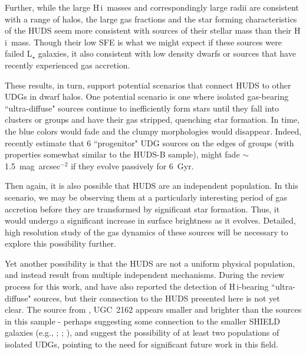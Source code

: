 \documentclass[twocolumn]{aastex6}
\newcommand{\hi}{H{\sc\,i}}
\begin{document}
Further, while the large \hi\ masses and correspondingly large radii are consistent with a range of halos, the large gas fractions and the star forming characteristics of the HUDS seem more consistent with sources of their stellar mass than their \hi\ mass. Though their low SFE is what we might expect if these sources were failed L$_{\star}$ galaxies, it also consistent with low density dwarfs or sources that have recently experienced gas accretion.%

These results, in turn, support potential scenarios that connect HUDS to other UDGs in dwarf halos. One potential scenario is one where isolated gas-bearing ``ultra-diffuse" sources continue to inefficiently form stars until they fall into clusters or groups and have their gas stripped, quenching star formation. In time, the blue colors would fade and the clumpy morphologies would disappear. Indeed, \cite{roman16b} recently estimate that 6 ``progenitor" UDG sources on the edges of groups (with properties somewhat similar to the HUDS-B sample), might fade $\sim$1.5~mag~arcsec$^{-2}$ if they evolve passively for 6~Gyr. 

Then again, it is also possible that HUDS are an independent population. In this scenario, we may be observing them at a particularly interesting period of gas accretion before they are transformed by significant star formation. Thus, it would undergo a significant increase in surface brightness as it evolves. Detailed, high resolution study of the gas dynamics of these sources will be necessary to explore this possibility further.

Yet another possibility is that the HUDS are not a uniform physical population, and instead result from multiple independent mechanisms. During the review process for this work, \cite{trujillo17a} and \cite{papastergis17a} have also reported the detection of \hi-bearing ``ultra-diffuse" sources, but their connection to the HUDS presented here is not yet clear. The source from \cite{trujillo17a}, UGC~2162 appears smaller and brighter than the sources in this sample - perhaps suggesting some connection to the smaller SHIELD galaxies (e.g., \citealp{cannon11a}; \citealp{mcquinn15a}; \citealp{teich16a}), and \cite{papastergis17a} suggest the possibility of at least two populations of isolated UDGs, pointing to the need for significant future work in this field.
\end{document}
